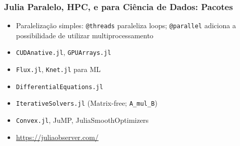 \documentclass{beamer}
\begin{document}
\begin{darkframes}
   \begin{frame}[fragile]
     \frametitle{Julia Paralelo, HPC, e para Ciência de Dados: Pacotes}
     \begin{itemize}
     \item Paralelização simples: \verb+@threads+ paraleliza loops; \verb+@parallel+ adiciona a possibilidade de utilizar multiprocessamento
     \item \verb+CUDAnative.jl+, \verb+GPUArrays.jl+ 
     \item \verb+Flux.jl+, \verb+Knet.jl+ para ML
     \item \verb+DifferentialEquations.jl+
     \item \verb+IterativeSolvers.jl+ (Matrix-free; \verb+A_mul_B+)
     \item \verb+Convex.jl+, JuMP, JuliaSmoothOptimizers
     \item \url{https://juliaobserver.com/}
    \end{itemize}
  \end{frame}


\end{darkframes}
\end{document}
